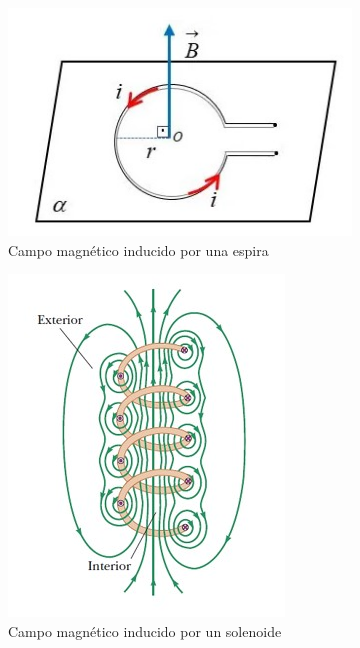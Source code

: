 \documentclass[arial,a4paper,print]{article}
\begin{document}
\begin{figure}
	\centering
	\hfill
	\begin{subfigure}[b]{0.5\textwidth}
		\centering
		\includegraphics[width=\textwidth]{espira}
		\caption{Campo magnético inducido por una espira}
		\label{fig:espira}
	\end{subfigure}
	\hfill
	\begin{subfigure}[b]{0.25\textwidth}
		\centering
		\includegraphics[width=\textwidth]{solenoide}
		\caption{Campo magnético inducido por un solenoide}
		\label{fig:five over x}
	\end{subfigure}
	\caption{}
	\label{fig:solenoide}
\end{figure}
\end{document}
